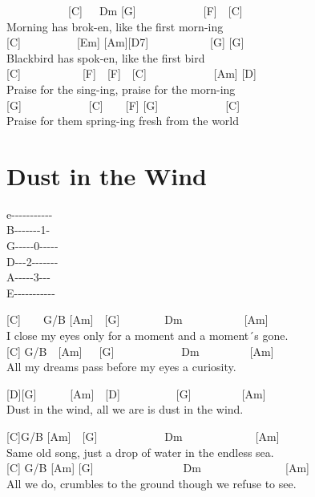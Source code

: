 \documentclass[
  letterpaper,
  a5paper]{memoir}
\begin{document}
~~~~~~~~~~~{[}C{]}~~~Dm {[}G{]}~~~~~~~~~~~~{[}F{]}~~{[}C{]}\\
Morning has brok-en, like the first morn-ing\\
{[}C{]}~~~~~~~~~~{[}Em{]} {[}Am{]}{[}D7{]}~~~~~~~~~~~{[}G{]} {[}G{]}\\
Blackbird has spok-en, like the first bird\\
{[}C{]}~~~~~~~~~~~{[}F{]}~~{[}F{]}~~{[}C{]}~~~~~~~~~~~~{[}Am{]}
{[}D{]}\\
Praise for the sing-ing, praise for the morn-ing\\
{[}G{]}~~~~~~~~~~~~{[}C{]}~~~~{[}F{]} {[}G{]}~~~~~~~~~~~~{[}C{]}\\
Praise for them spring-ing fresh from the world

\hypertarget{dust-in-the-wind}{%
\chapter{Dust in the Wind}\label{dust-in-the-wind}}

e\textbar-\/-\/-\/-\/-\/-\/-\/-\/-\/-\/-\textbar{}\\
B-\/-\/-\/-\/-\/-\/-1-\textbar{}\\
G\textbar-\/-\/-\/-\/-0-\/-\/-\/-\/-\textbar{}\\
D\textbar-\/-\/-2-\/-\/-\/-\/-\/-\/-\textbar{}\\
A-\/-\/-\/-\/-3-\/-\/-\textbar{}\\
E\textbar-\/-\/-\/-\/-\/-\/-\/-\/-\/-\/-\textbar{}

{[}C{]}~~~~G/B {[}Am{]}~~{[}G{]}~~~~~~~~Dm~~~~~~~~~~~{[}Am{]}\\
I close my eyes only for a moment and a moment´s gone.\\
{[}C{]} G/B~~{[}Am{]}~~~{[}G{]}~~~~~~~~~~~~Dm~~~~~~~~~{[}Am{]}\\
All my dreams pass before my eyes a curiosity.

\begin{tcolorbox}[enhanced jigsaw, breakable, bottomrule=.15mm, colframe=quarto-callout-color-frame, rightrule=.15mm, opacityback=0, colback=white, arc=.35mm, toprule=.15mm, leftrule=.75mm, left=2mm]

{[}D{]}{[}G{]}~~~~~~{[}Am{]}~~{[}D{]}~~~~~~~~~~{[}G{]}~~~~~~~~~{[}Am{]}\\
Dust in the wind, all we are is dust in the wind.

\end{tcolorbox}

{[}C{]}G/B {[}Am{]}~~{[}G{]}~~~~~~~~~~~~Dm~~~~~~~~~~~~~{[}Am{]}\\
Same old song, just a drop of water in the endless sea.\\
{[}C{]} G/B {[}Am{]} {[}G{]}~~~~~~~~~~~~~~~~Dm~~~~~~~~~~~~~~~{[}Am{]}\\
All we do, crumbles to the ground though we refuse to see.
\end{document}
